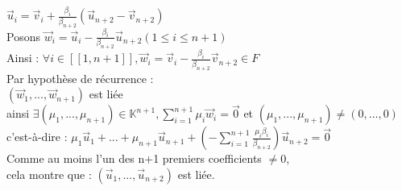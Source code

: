 \documentclass{article}
\begin{document}
$\vec u_i=\vec v_i+ \frac{\beta_i}{\beta_{n+2}}(\vec u_{n+2}-\vec v_{n+2})$ \\
Posons $\vec w_i= \vec u_i - \frac{\beta_i}{\beta_{n+2}}\vec u_{n+2} (1 \leq i \leq n+1)$ \\
Ainsi : $\forall i \in [[1,n+1]], \vec w_i=\vec v_i-\frac{\beta_i}{\beta_{n+2}} \vec v_{n+2} \in F $ \\
Par hypothèse de récurrence : \\
$(\vec w_1,...,\vec w_{n+1})$ est liée \\
ainsi $\exists (\mu_1,...,\mu_{n+1}) \in \mathbb K^{n+1}, \sum_{i=1}^{n+1} \mu_i \vec w_i= \vec 0$ et $(\mu_1,...,\mu_{n+1}) \neq (0,...,0)$ \\
c'est-à-dire : $\mu_1 \vec u_1 +... +\mu_{n+1} \vec u_{n+1}+(- \sum_{i=1}^{n+1} \frac{\mu_i \beta_i}{\beta_{n+2}}) \vec u_{n+2}= \vec 0$ \\
Comme au moins l'un des n+1 premiers coefficients $\neq 0$, \\
cela montre que : $(\vec u_1,..., \vec u_{n+2})$ est liée.
\end{document}
